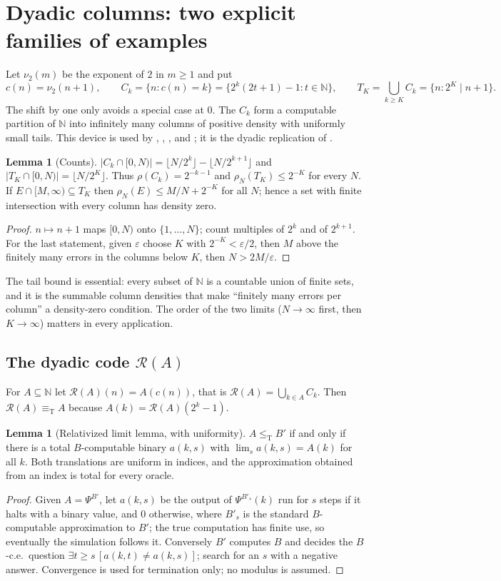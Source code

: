 \documentclass[11pt,letterpaper]{article}
\theoremstyle{definition}
\newtheorem{lemma}[definition]{Lemma}
\numberwithin{equation}{section}
\newcommand{\N}{\mathbb N}
\newcommand{\leT}{\le_{\mathrm T}}
\newcommand{\eqT}{\equiv_{\mathrm T}}
\newcommand{\Rc}{\mathcal R}
\newcommand{\src}[1]{\leavevmode{\sffamily\footnotesize\color{Steel}[#1]}}
\newcommand{\rep}[1]{\leavevmode{\sffamily\small\color{Steel}R#1}}
\begin{document}
\section{Dyadic columns: two explicit families of examples}\label{sec:columns}
Let $\nu_2(m)$ be the exponent of $2$ in $m\ge1$ and put
\[
 c(n)=\nu_2(n+1),\qquad C_k=\{n:c(n)=k\}=\{2^k(2t+1)-1:t\in\N\},\qquad T_K=\bigcup_{k\ge K}C_k=\{n:2^K\mid n+1\}.
\]
The shift by one only avoids a special case at $0$. The $C_k$ form a computable partition of $\N$ into infinitely many columns of positive density with uniformly small tails. This device is used by \rep3, \rep4, \rep5, \rep8 and \rep9; it is the dyadic replication of \cite[Definition~2.7]{JS}.

\begin{lemma}[Counts]\label{lem:counts}\src{R3, R4, R5, R8, R9}
$|C_k\cap[0,N)|=\lfloor N/2^k\rfloor-\lfloor N/2^{k+1}\rfloor$ and $|T_K\cap[0,N)|=\lfloor N/2^K\rfloor$. Thus $\rho(C_k)=2^{-k-1}$ and $\rho_N(T_K)\le2^{-K}$ for every $N$. If $E\cap[M,\infty)\subseteq T_K$ then $\rho_N(E)\le M/N+2^{-K}$ for all $N$; hence a set with finite intersection with every column has density zero.
\end{lemma}
\begin{proof}
$n\mapsto n+1$ maps $[0,N)$ onto $\{1,\dots,N\}$; count multiples of $2^k$ and of $2^{k+1}$. For the last statement, given $\varepsilon$ choose $K$ with $2^{-K}<\varepsilon/2$, then $M$ above the finitely many errors in the columns below $K$, then $N>2M/\varepsilon$.
\end{proof}
The tail bound is essential: every subset of $\N$ is a countable union of finite sets, and it is the summable column densities that make ``finitely many errors per column'' a density-zero condition. The order of the two limits ($N\to\infty$ first, then $K\to\infty$) matters in every application.

\subsection{The dyadic code \texorpdfstring{$\Rc(A)$}{R(A)}}
For $A\subseteq\N$ let $\Rc(A)(n)=A(c(n))$, that is $\Rc(A)=\bigcup_{k\in A}C_k$. Then $\Rc(A)\eqT A$ because $A(k)=\Rc(A)(2^k-1)$.

\begin{lemma}[Relativized limit lemma, with uniformity]\label{lem:limit}\src{R3, R4}
$A\leT B'$ if and only if there is a total $B$-computable binary $a(k,s)$ with $\lim_sa(k,s)=A(k)$ for all $k$. Both translations are uniform in indices, and the approximation obtained from an index is total for every oracle.
\end{lemma}
\begin{proof}
Given $A=\Psi^{B'}$, let $a(k,s)$ be the output of $\Psi^{B'_s}(k)$ run for $s$ steps if it halts with a binary value, and $0$ otherwise, where $B'_s$ is the standard $B$-computable approximation to $B'$; the true computation has finite use, so eventually the simulation follows it. Conversely $B'$ computes $B$ and decides the $B$-c.e.\ question $\exists t\ge s\,[a(k,t)\ne a(k,s)]$; search for an $s$ with a negative answer. Convergence is used for termination only; no modulus is assumed.
\end{proof}
\end{document}
